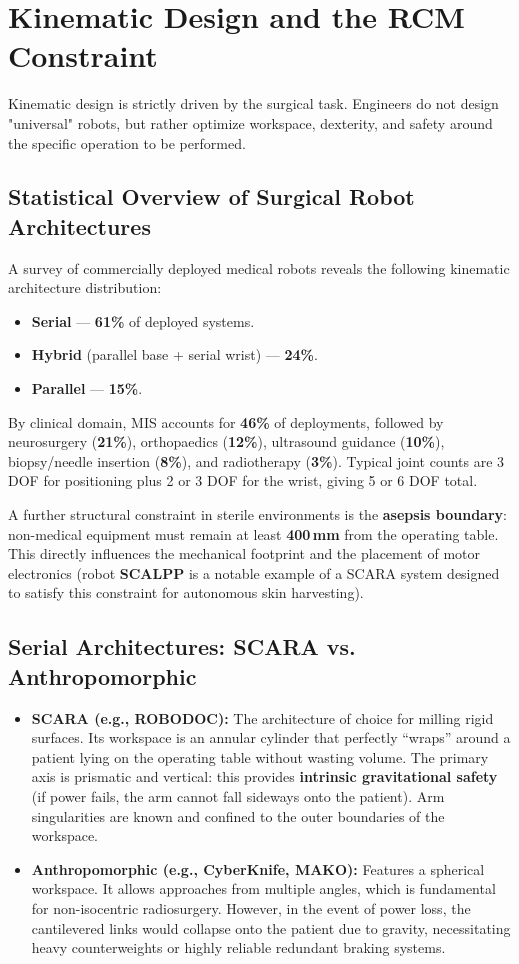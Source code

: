\documentclass[11pt,a4paper,twoside]{report}
\begin{document}
\chapter{Kinematic Design and the RCM Constraint}

Kinematic design is strictly driven by the surgical task. Engineers do not design "universal" robots, but rather optimize workspace, dexterity, and safety around the specific operation to be performed.

\section{Statistical Overview of Surgical Robot Architectures}
A survey of commercially deployed medical robots reveals the following kinematic architecture distribution:
\begin{itemize}
    \item \textbf{Serial} — \textbf{61\%} of deployed systems.
    \item \textbf{Hybrid} (parallel base + serial wrist) — \textbf{24\%}.
    \item \textbf{Parallel} — \textbf{15\%}.
\end{itemize}
By clinical domain, MIS accounts for \textbf{46\%} of deployments, followed by neurosurgery (\textbf{21\%}), orthopaedics (\textbf{12\%}), ultrasound guidance (\textbf{10\%}), biopsy/needle insertion (\textbf{8\%}), and radiotherapy (\textbf{3\%}). Typical joint counts are 3 DOF for positioning plus 2 or 3 DOF for the wrist, giving 5 or 6 DOF total.

A further structural constraint in sterile environments is the \textbf{asepsis boundary}: non-medical equipment must remain at least \textbf{400\,mm} from the operating table. This directly influences the mechanical footprint and the placement of motor electronics (robot \textbf{SCALPP} is a notable example of a SCARA system designed to satisfy this constraint for autonomous skin harvesting).

\section{Serial Architectures: SCARA vs. Anthropomorphic}
\begin{itemize}
    \item \textbf{SCARA (e.g., ROBODOC):} The architecture of choice for milling rigid surfaces. Its workspace is an annular cylinder that perfectly ``wraps'' around a patient lying on the operating table without wasting volume. The primary axis is prismatic and vertical: this provides \textbf{intrinsic gravitational safety} (if power fails, the arm cannot fall sideways onto the patient). Arm singularities are known and confined to the outer boundaries of the workspace.
    \item \textbf{Anthropomorphic (e.g., CyberKnife, MAKO):} Features a spherical workspace. It allows approaches from multiple angles, which is fundamental for non-isocentric radiosurgery. However, in the event of power loss, the cantilevered links would collapse onto the patient due to gravity, necessitating heavy counterweights or highly reliable redundant braking systems.
\end{itemize}
\end{document}
